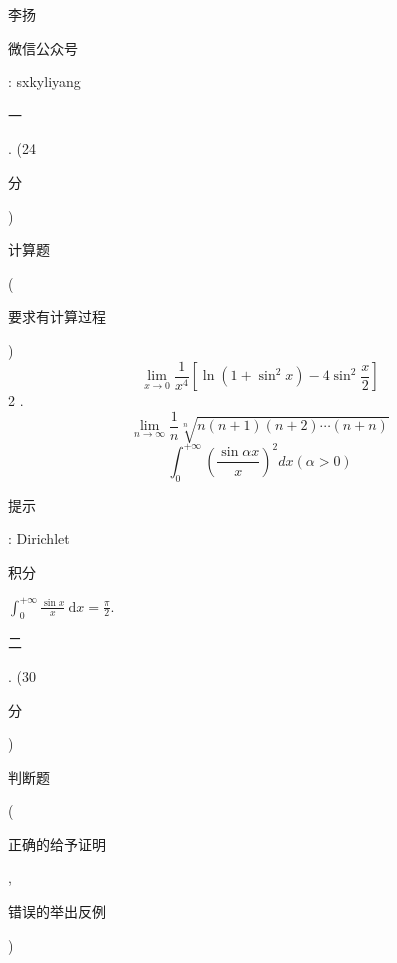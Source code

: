 \documentclass[10pt]{article}
\begin{document}
\begin{CJK}{UTF8}{mj}李扬\end{CJK}

\begin{CJK}{UTF8}{mj}微信公众号\end{CJK}: sxkyliyang

\begin{CJK}{UTF8}{mj}一\end{CJK}. (24 \begin{CJK}{UTF8}{mj}分\end{CJK}) \begin{CJK}{UTF8}{mj}计算题\end{CJK} (\begin{CJK}{UTF8}{mj}要求有计算过程\end{CJK})
$$
\lim _{x \rightarrow 0} \frac{1}{x^{4}}\left[\ln \left(1+\sin ^{2} x\right)-4 \sin ^{2} \frac{x}{2}\right]
$$
2 .
$$
\lim _{n \rightarrow \infty} \frac{1}{n} \sqrt[n]{n(n+1)(n+2) \cdots(n+n)}
$$
$$
\int_{0}^{+\infty}\left(\frac{\sin \alpha x}{x}\right)^{2} d x(\alpha>0)
$$
\begin{CJK}{UTF8}{mj}提示\end{CJK}: Dirichlet \begin{CJK}{UTF8}{mj}积分\end{CJK} $\int_{0}^{+\infty} \frac{\sin x}{x} \mathrm{~d} x=\frac{\pi}{2}$.

\begin{CJK}{UTF8}{mj}二\end{CJK}. (30 \begin{CJK}{UTF8}{mj}分\end{CJK}) \begin{CJK}{UTF8}{mj}判断题\end{CJK} (\begin{CJK}{UTF8}{mj}正确的给予证明\end{CJK}, \begin{CJK}{UTF8}{mj}错误的举出反例\end{CJK})
\end{document}
